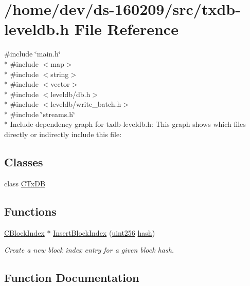 \hypertarget{txdb-leveldb_8h}{}\section{/home/dev/ds-\/160209/src/txdb-\/leveldb.h File Reference}
\label{txdb-leveldb_8h}
{\ttfamily \#include \char`\"{}main.\+h\char`\"{}}\\*
{\ttfamily \#include $<$map$>$}\\*
{\ttfamily \#include $<$string$>$}\\*
{\ttfamily \#include $<$vector$>$}\\*
{\ttfamily \#include $<$leveldb/db.\+h$>$}\\*
{\ttfamily \#include $<$leveldb/write\+\_\+batch.\+h$>$}\\*
{\ttfamily \#include \char`\"{}streams.\+h\char`\"{}}\\*
Include dependency graph for txdb-\/leveldb.h\+:
This graph shows which files directly or indirectly include this file\+:
\subsection*{Classes}
\begin{DoxyCompactItemize}
\item 
class \hyperlink{class_c_tx_d_b}{C\+Tx\+D\+B}
\end{DoxyCompactItemize}
\subsection*{Functions}
\begin{DoxyCompactItemize}
\item 
\hyperlink{class_c_block_index}{C\+Block\+Index} $\ast$ \hyperlink{txdb-leveldb_8h_af3adfd64a90ee443bfa5fe16321aa2d7}{Insert\+Block\+Index} (\hyperlink{classuint256}{uint256} \hyperlink{cache_8cc_a11ecb029164e055f28f4123ce3748862}{hash})
\begin{DoxyCompactList}\small\item\em Create a new block index entry for a given block hash. \end{DoxyCompactList}\end{DoxyCompactItemize}


\subsection{Function Documentation}
\hypertarget{txdb-leveldb_8h_af3adfd64a90ee443bfa5fe16321aa2d7}{}

